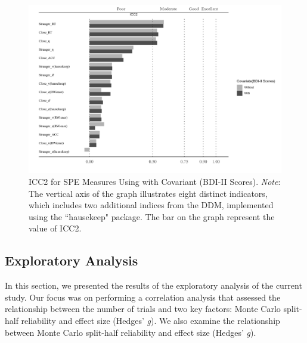 \documentclass[sn-apa]{sn-jnl}%
\theoremstyle{thmstyleone}%
\theoremstyle{thmstyletwo}%
\theoremstyle{thmstylethree}%
\begin{document}
\begin{figure}[!ht]
	\centering
	\includegraphics[width=1.1\textwidth]{./Figure/Fig5_BDI_cov.png}
	\caption[ICC2 for SPE Measures Using \textcite{hu2023data} with Covariant (BDI-II Scores)]{ICC2 for SPE Measures Using \textcite{hu2023data} with Covariant (BDI-II Scores).  \textit{Note}: The vertical axis of the graph illustrates eight distinct indicators, which includes two additional indices from the DDM, implemented using the ``hausekeep" package. The bar on the graph represent the value of ICC2.
	}\label{fig:BDI_cov_Result}
\end{figure}


\subsection{Exploratory Analysis}\label{sec:Exploratory}

In this section, we presented the results of the exploratory analysis of the current study. Our focus was on performing a correlation analysis that assessed the relationship between the number of trials and two key factors: Monte Carlo split-half reliability and effect size (Hedges’ \textit{g}). We also examine the relationship between Monte Carlo split-half reliability and effect size (Hedges’ \textit{g}).
\end{document}
